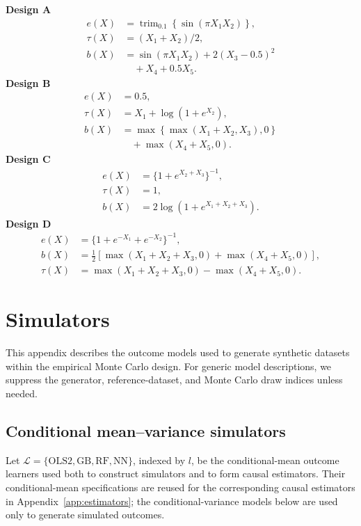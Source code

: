 \begin{landscape}
\noindent\textbf{Design A}
\[
\begin{aligned}
e(X)&=\operatorname{trim}_{0.1}\!\left\{\sin(\pi X_1X_2)\right\},\\
\tau(X)&=(X_1+X_2)/2,\\
b(X)&=\sin(\pi X_1X_2)+2(X_3-0.5)^2\\
&\quad+X_4+0.5X_5.
\end{aligned}
\]
\noindent\textbf{Design B}
\[
\begin{aligned}
e(X)&=0.5,\\
\tau(X)&=X_1+\log(1+e^{X_2}),\\
b(X)&=\max\!\left\{\max(X_1+X_2,X_3),0\right\}\\
&\quad+\max(X_4+X_5,0).
\end{aligned}
\]
\noindent\textbf{Design C}
\[
\begin{aligned}
e(X)&=\{1+e^{X_2+X_3}\}^{-1},\\
\tau(X)&=1,\\
b(X)&=2\log\!\left(1+e^{X_1+X_2+X_3}\right).
\end{aligned}
\]
\noindent\textbf{Design D}
\[
\begin{aligned}
e(X)&=\{1+e^{-X_1}+e^{-X_2}\}^{-1},\\
b(X)&=\tfrac12\left[\max(X_1+X_2+X_3,0)+\max(X_4+X_5,0)\right],\\
\tau(X)&=\max(X_1+X_2+X_3,0)-\max(X_4+X_5,0).
\end{aligned}
\]

\clearpage
\section{Simulators}
\label{app:simulators}

This appendix describes the outcome models used to generate synthetic datasets within the empirical Monte Carlo design.
For generic model descriptions, we suppress the generator, reference-dataset, and Monte Carlo draw indices unless needed.

\subsection{Conditional mean--variance simulators}

Let \(\mathcal L=\{\mathrm{OLS2},\mathrm{GB},\mathrm{RF},\mathrm{NN}\}\), indexed by \(l\), be the conditional-mean outcome learners used both to construct simulators and to form causal estimators. Their conditional-mean specifications are reused for the corresponding causal estimators in Appendix~\ref{app:estimators}; the conditional-variance models below are used only to generate simulated outcomes.


\end{landscape}
